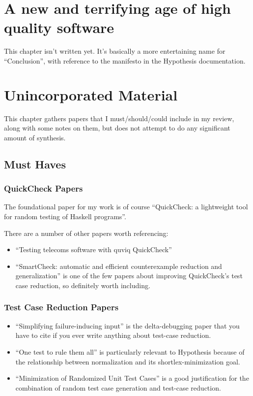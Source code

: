 \chapter{A new and terrifying age of high quality software}\label{chap:conclusion}

This chapter isn't written yet.
It's basically a more entertaining name for ``Conclusion'',
with reference to the manifesto in the Hypothesis documentation.

\chapter{Unincorporated Material}

This chapter gathers papers that I must/should/could include in my review,
along with some notes on them,
but does not attempt to do any significant amount of synthesis.

\section{Must Haves}

\subsection{QuickCheck Papers}

The foundational paper for my work is of course ``QuickCheck: a lightweight tool for random testing of Haskell programs''\cite{DBLP:conf/icfp/ClaessenH00}.

There are a number of other papers worth referencing:

\begin{itemize}
\item ``Testing telecoms software with quviq QuickCheck''\cite{DBLP:conf/erlang/ArtsHJW06}
\item ``SmartCheck: automatic and efficient counterexample reduction and generalization''\cite{DBLP:conf/haskell/Pike14} is one of the few papers about improving QuickCheck's test case reduction,
so definitely worth including.
\end{itemize}

\subsection{Test Case Reduction Papers}

\begin{itemize}
\item ``Simplifying failure-inducing input''\cite{DBLP:conf/issta/HildebrandtZ00} is the delta-debugging paper that you have to cite if you ever write anything about test-case reduction.
\item ``One test to rule them all''\cite{DBLP:conf/issta/GroceHK17} is particularly relevant to Hypothesis because of the relationship between normalization and its shortlex-minimization goal.
\item ``Minimization of Randomized Unit Test Cases''\cite{DBLP:conf/issre/LeiA05} is a good justification for the combination of random test case generation and test-case reduction.
\end{itemize}

